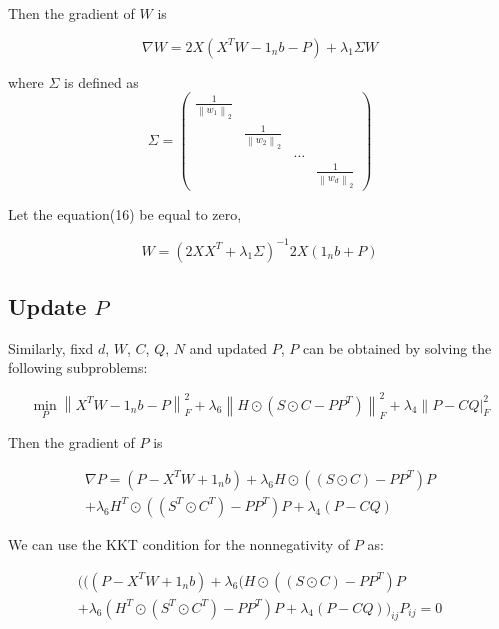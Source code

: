 \documentclass[final,3p,times]{elsarticle}
\begin{document}
Then the gradient of $W$ is

\begin{equation}
	\nabla W=2 X\left(X^{T} W-1_{n} b-P\right)+\lambda_{1} \Sigma W
\end{equation}

\noindent where $\Sigma$ is defined as
$$
\Sigma=\left(\begin{array}{cccc}
	\frac{1}{\left\|w_{1}\right\|_{2}} & & & \\
	& \frac{1}{\left\|w_{2}\right\|_{2}} & & \\
	& & \ldots & \\
	& & & \frac{1}{\left\|w_{d}\right\|_{2}}
\end{array}\right)
$$

Let the equation(16) be equal to zero,

\begin{equation}
	W=\left(2 X X^{T}+\lambda_{1} \Sigma\right)^{-1} 2 X\left(1_{n} b+P\right)
\end{equation}

\subsection{Update $P$}

Similarly, fixd $d$, $W$, $C$, $Q$, $N$ and updated $P$, $P$ can be obtained by solving the following subproblems:

\begin{equation}
	\min _{P}\left\|X^{T} W-1_{n} b-P\right\|_{F}^{2}+\lambda_{6}\left\|H \odot\left(S \odot C-P P^{T}\right)\right\|_{F}^{2}+\lambda_{4} \| P-\left.C Q\right|_{F} ^{2}
\end{equation}

Then the gradient of $P$ is

\begin{equation}
	\begin{array}{l}
		\nabla P=\left(P-X^{T} W+1_{n} b\right)+\lambda_{6} H \odot\left((S \odot C)-P P^{T}\right) P \\
		+\lambda_{6} H^{T} \odot\left(\left(S^{T} \odot C^{T}\right)-P P^{T}\right) P+\lambda_{4}(P-C Q)
	\end{array}
\end{equation}

We can use the KKT condition for the nonnegativity of $P$ as:

\begin{equation}
	\begin{array}{l}
		(((P-X^{T} W+1_{n} b)+\lambda_{6} (H\odot((S \odot C)-P P^{T}) P\\
		+\lambda_{6} (H^{T} \odot(S^{T} \odot C^{T})-P P^{T}) P+\lambda_{4}(P-CQ))_{ij} P_{ij}=0
	\end{array}
\end{equation}
\end{document}
